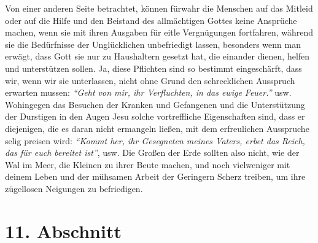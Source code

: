 Von einer anderen Seite
betrachtet, können fürwahr
die Menschen auf das Mitleid oder auf die Hilfe und
den Beistand des allmächtigen Gottes keine Ansprüche machen, wenn sie mit ihren
Ausgaben für eitle Vergnügungen fortfahren, während sie die Bedürfnisse der
Unglücklichen unbefriedigt lassen, besonders wenn man erwägt, dass Gott sie nur
zu Haushaltern gesetzt hat, die einander dienen, helfen und unterstützen sollen.
Ja, diese Pflichten sind so bestimmt eingeschärft, dass wir, wenn wir sie
unterlassen, nicht ohne Grund den schrecklichen Ausspruch erwarten mussen:
\textit{"`Geht von mir, ihr Verfluchten, in das ewige
Feuer."'} usw.
Wohingegen das Besuchen der Kranken und Gefangenen und die
Unterstützung der Durstigen in den Augen Jesu solche vortreffliche Eigenschaften
sind, dass er diejenigen, die es daran nicht ermangeln ließen, mit dem
erfreulichen Ausspruche selig preisen wird:
\textit{"`Kommt her, ihr Gesegneten meines
Vaters, erbet das Reich, das für euch bereitet ist"'}, usw. Die Großen der
Erde sollten also nicht, wie der Wal im Meer, die Kleinen zu ihrer Beute
machen, und noch vielweniger mit deinem Leben und der mühsamen Arbeit der
Geringern Scherz treiben, um ihre zügellosen Neigungen zu befriedigen.

\section{11. Abschnitt} \label{kap18_ab11}

